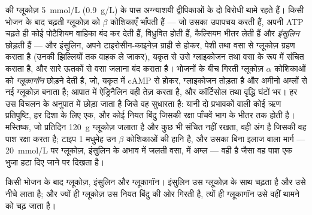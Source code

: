 \begin{proposition}[दो हॉर्मोन और एक नियत बिंदु]\label{prop:b2:cell-signalling:glucose}
 की ग्लूकोज़ \qty{5}{mmol/L} (\qty{0.9}{g/L}) के पास
अग्न्याशयी द्वीपिकाओं के दो विरोधी  थामे रहते हैं। किसी भोजन के बाद
चढ़ती ग्लूकोज़ को $\beta$ कोशिकाएँ भाँपती हैं --- जो
उसका उपापचय करती हैं, अपनी ATP चढ़ते ही कोई पोटैशियम वाहिका बंद कर देती हैं,
विध्रुवित होती हैं, कैल्सियम भीतर लेती हैं और \emph{इंसुलिन} छोड़ती हैं --- और इंसुलिन,
अपने टाइरोसीन-काइनेज़ ग्राही से होकर, पेशी तथा वसा से ग्लूकोज़
ग्रहण कराता है (उनकी झिल्लियों तक वाहक ले जाकर), यकृत से
उसे ग्लाइकोजन तथा वसा के रूप में संचित कराता है, और सारे ऊतकों से वसा जलाना बंद कराता है।
भोजनों के बीच गिरती ग्लूकोज़ $\alpha$ कोशिकाओं को
\emph{ग्लूकागॉन} छोड़ने देती है, जो, यकृत में cAMP से होकर, ग्लाइकोजन
तोड़ता है और अमीनो अम्लों से नई ग्लूकोज़ बनाता है; आपात में ऐड्रिनैलिन वही
तेज़ करता है, और कॉर्टिसोल तथा वृद्धि  घंटों भर।
हर  उस विचलन के अनुपात में छोड़ा जाता है जिसे वह
सुधारता है: यानी दो प्रभावकों वाली कोई ऋण प्रतिपुष्टि, हर दिशा के लिए एक,
और कोई नियत बिंदु जिसकी रक्षा पाँचवें भाग के भीतर तक होती है। मस्तिष्क,
जो प्रतिदिन \qty{120}{g} ग्लूकोज़ जलाता है और कुछ भी संचित नहीं रखता, वही
अंग है जिसकी वह पाश रक्षा करता है; टाइप 1 मधुमेह उन
$\beta$ कोशिकाओं की हानि है, और उसका बिना इलाज वाला मार्ग ---
\qty{20}{mmol/L} पर ग्लूकोज़, इंसुलिन के अभाव में जलती वसा,  में अम्ल
--- वही है जैसा वह पाश एक भुजा हटा दिए जाने पर दिखता है।
\end{proposition}

\begin{omfigure}

{\small किसी भोजन के बाद ग्लूकोज़, इंसुलिन और ग्लूकागॉन। इंसुलिन
उस ग्लूकोज़ के साथ चढ़ता है और उसे नीचे लाता है; और ज्यों ही ग्लूकोज़ उस नियत
बिंदु की ओर गिरती है, त्यों ही ग्लूकागॉन उसे वहीं थामने को चढ़ जाता है।}
\end{omfigure}

